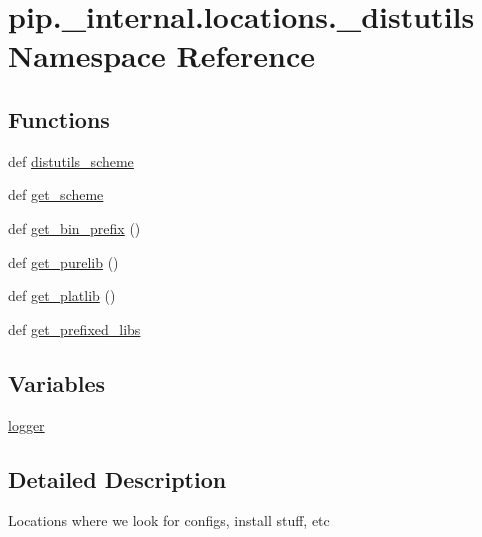 \hypertarget{namespacepip_1_1__internal_1_1locations_1_1__distutils}{}\section{pip.\+\_\+internal.\+locations.\+\_\+distutils Namespace Reference}
\label{namespacepip_1_1__internal_1_1locations_1_1__distutils}
\subsection*{Functions}
\begin{DoxyCompactItemize}
\item 
def \hyperlink{namespacepip_1_1__internal_1_1locations_1_1__distutils_abac185943a7fff1d76f1fc7aa039f301}{distutils\+\_\+scheme}
\item 
def \hyperlink{namespacepip_1_1__internal_1_1locations_1_1__distutils_af2f948b43ca3d2aac27d3e3779cbe8f4}{get\+\_\+scheme}
\item 
def \hyperlink{namespacepip_1_1__internal_1_1locations_1_1__distutils_a2b2f4f6b38f44f542e80f0db364e8f34}{get\+\_\+bin\+\_\+prefix} ()
\item 
def \hyperlink{namespacepip_1_1__internal_1_1locations_1_1__distutils_a49902d518edb7e6ac648baed287611b0}{get\+\_\+purelib} ()
\item 
def \hyperlink{namespacepip_1_1__internal_1_1locations_1_1__distutils_a6310269c08b2bc5108866607a2af3c7a}{get\+\_\+platlib} ()
\item 
def \hyperlink{namespacepip_1_1__internal_1_1locations_1_1__distutils_aea6f1449248bd506cae6c28526a17808}{get\+\_\+prefixed\+\_\+libs}
\end{DoxyCompactItemize}
\subsection*{Variables}
\begin{DoxyCompactItemize}
\item 
\hyperlink{namespacepip_1_1__internal_1_1locations_1_1__distutils_ae32ba9cca99a76e803b4a0370d5dfa26}{logger}
\end{DoxyCompactItemize}


\subsection{Detailed Description}
\begin{DoxyVerb}Locations where we look for configs, install stuff, etc\end{DoxyVerb}
 

